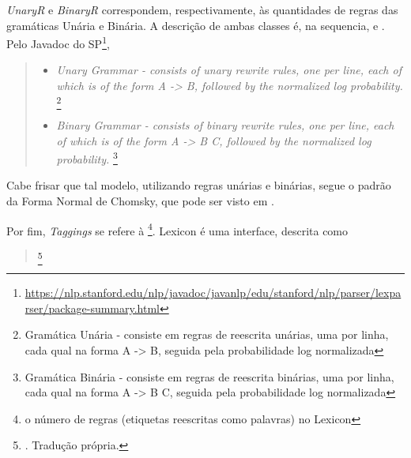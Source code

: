 \textit{UnaryR} e \textit{BinaryR} correspondem, respectivamente, às quantidades de regras das gramáticas Unária e Binária. A descrição de ambas classes é, na sequencia,  e . Pelo Javadoc do SP\footnote{\url{https://nlp.stanford.edu/nlp/javadoc/javanlp/edu/stanford/nlp/parser/lexparser/package-summary.html}},
\begin{quote}
    \begin{itemize}
        \item \textit{Unary Grammar - consists of unary rewrite rules, one per line, each of which is of the form A -> B, followed by the normalized log probability.}
        \footnote{Gramática Unária - consiste em regras de reescrita unárias, uma por linha, cada qual na forma A -> B, seguida pela probabilidade log normalizada}
        \item \textit{Binary Grammar - consists of binary rewrite rules, one per line, each of which is of the form A -> B C, followed by the normalized log probability.}
        \footnote{Gramática Binária - consiste em regras de reescrita binárias, uma por linha, cada qual na forma A -> B C, seguida pela probabilidade log normalizada}
    \end{itemize}
\end{quote}

Cabe frisar que tal modelo, utilizando regras unárias e binárias, segue o padrão da Forma Normal de Chomsky, que pode ser visto em \cite[p~389]{Manning1999FoundationsNLP}.

Por fim, \textit{Taggings} se refere à 
\footnote{o número de regras (etiquetas reescritas como palavras) no Lexicon}.
Lexicon é uma interface, descrita como
\begin{quote}
    \footnote{. Tradução própria.}
\end{quote}

